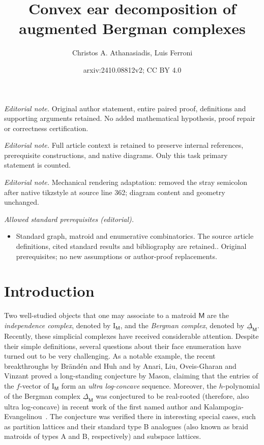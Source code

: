 \documentclass[11pt]{amsart}
\title{Convex ear decomposition of augmented Bergman complexes}
\author{Christos A. Athanasiadis, Luis Ferroni}
\date{arxiv:2410.08812v2; CC BY 4.0}
\theoremstyle{theorems}
\theoremstyle{definition}
\newcommand{\M}{{\mathsf{M}}}
\newcommand{\I}{{\mathrm{I}}}
\newcommand{\uDelta}{\underline{\Delta}}
\begin{document}
\maketitle
\noindent\textit{Editorial note.} Original author statement, entire paired proof, definitions and supporting arguments retained. No added mathematical hypothesis, proof repair or correctness certification.\par\medskip
\noindent\textit{Editorial note.} Full article context is retained to preserve internal references, prerequisite constructions, and native diagrams. Only this task primary statement is counted.\par\medskip
\noindent\textit{Editorial note.} Mechanical rendering adaptation: removed the stray semicolon after native tikzstyle at source line 362; diagram content and geometry unchanged.\par\medskip
\noindent\textit{Allowed standard prerequisites (editorial).}\begin{itemize}
\item Standard graph, matroid and enumerative combinatorics. The source article definitions, cited standard results and bibliography are retained.. Original prerequisites; no new assumptions or author-proof replacements.
\end{itemize}\medskip
\section{Introduction}
\label{sec:intro}

Two well-studied objects that one may associate to a matroid $\M$ are the 
\emph{independence complex}, denoted by $\I_{\M}$, and the \emph{Bergman 
complex}, denoted by $\uDelta_{\M}$. Recently, these simplicial complexes 
have received considerable attention. Despite their simple definitions, 
several questions about their face enumeration have turned out to be very 
challenging. As a notable example, the recent breakthroughs by Br\"and\'en 
and Huh \cite{BH20} and by Anari, Liu, Oveis-Gharan and Vinzant 
\cite{ALOV24} proved a long-standing conjecture by Mason, claiming that 
the entries of the $f$-vector of $\I_{\M}$ form an \emph{ultra 
log-concave} sequence. Moreover, the $h$-polynomial of the Bergman complex 
$\uDelta_{\M}$ was conjectured to be real-rooted (therefore, also ultra 
log-concave) in recent work of the first named author and 
Kalampogia-Evangelinou~\cite{AK23}. The conjecture was verified there
in interesting special cases, such as partition lattices and their 
standard type B analogues (also known as braid matroids of types A and B,
respectively) and subspace lattices.
\end{document}
